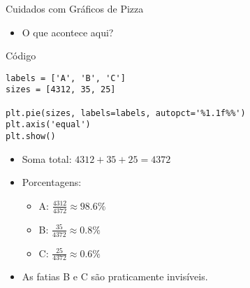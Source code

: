 \begin{frame}[fragile]{Cuidados com Gráficos de Pizza}
    \begin{itemize}
        \item O que acontece aqui?
    \end{itemize}

    \begin{block}{Código}
        \begin{verbatim}
labels = ['A', 'B', 'C']
sizes = [4312, 35, 25]

plt.pie(sizes, labels=labels, autopct='%1.1f%%')
plt.axis('equal')
plt.show()
\end{verbatim}
    \end{block}

    \begin{itemize}
        \item Soma total: $4312 + 35 + 25 = 4372$
        \item Porcentagens:
              \begin{itemize}
                  \item A: $\frac{4312}{4372} \approx 98.6\%$
                  \item B: $\frac{35}{4372} \approx 0.8\%$
                  \item C: $\frac{25}{4372} \approx 0.6\%$
              \end{itemize}
        \item As fatias B e C são praticamente invisíveis.

    \end{itemize}
\end{frame}

